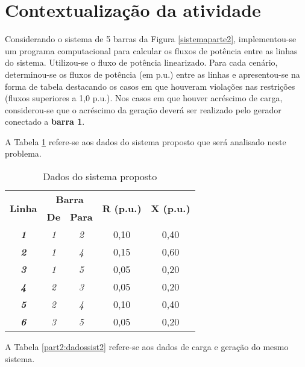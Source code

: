 \section{Contextualização da atividade}

Considerando o sistema de 5 barras da Figura \ref{sistemaparte2}, implementou-se um programa computacional para calcular os fluxos de potência entre as linhas do sistema. Utilizou-se o fluxo de potência linearizado. Para cada cenário, determinou-se os fluxos de potência (em p.u.) entre as linhas e apresentou-se na forma de tabela destacando os casos em que houveram violações nas restrições (fluxos superiores a 1,0 p.u.). Nos casos em que houver acréscimo de carga, considerou-se que o acréscimo da geração deverá ser realizado pelo gerador conectado a \textbf{barra 1}.

A Tabela \ref{part2:dadossist} refere-se aos dados do sistema proposto que será analisado neste problema.

\begin{table}[!h]
\centering
\caption{Dados do sistema proposto}
\label{part2:dadossist}
\begin{tabular}{|c|c|c|c|c|}
\hline
\multirow{2}{*}{\textbf{Linha}} & \multicolumn{2}{c|}{\textbf{Barra}} & \multirow{2}{*}{\textbf{R (p.u.)}} & \multirow{2}{*}{\textbf{X (p.u.)}} \\ \cline{2-3}
 & \textbf{De} & \textbf{Para} &  &  \\ \hline
\textit{\textbf{1}} & \textit{1} & \textit{2} & 0,10 & 0,40 \\ \hline
\textit{\textbf{2}} & \textit{1} & \textit{4} & 0,15 & 0,60 \\ \hline
\textit{\textbf{3}} & \textit{1} & \textit{5} & 0,05 & 0,20 \\ \hline
\textit{\textbf{4}} & \textit{2} & \textit{3} & 0,05 & 0,20 \\ \hline
\textit{\textbf{5}} & \textit{2} & \textit{4} & 0,10 & 0,40 \\ \hline
\textit{\textbf{6}} & \textit{3} & \textit{5} & 0,05 & 0,20 \\ \hline
\end{tabular}
\end{table}

A Tabela \ref{part2:dadossist2} refere-se aos dados de carga e geração do mesmo sistema.

